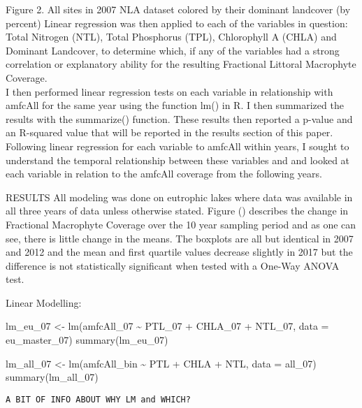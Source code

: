 \documentclass[
]{book}
\newenvironment{Shaded}{\begin{snugshade}}{\end{snugshade}}
\newcommand{\AttributeTok}[1]{\textcolor[rgb]{0.77,0.63,0.00}{#1}}
\newcommand{\FunctionTok}[1]{\textcolor[rgb]{0.00,0.00,0.00}{#1}}
\newcommand{\NormalTok}[1]{#1}
\newcommand{\OtherTok}[1]{\textcolor[rgb]{0.56,0.35,0.01}{#1}}
\newcommand{\SpecialCharTok}[1]{\textcolor[rgb]{0.00,0.00,0.00}{#1}}
\begin{document}
Figure 2. All sites in 2007 NLA dataset colored by their dominant landcover (by percent)
Linear regression was then applied to each of the variables in question: Total Nitrogen (NTL), Total Phosphorus (TPL), Chlorophyll A (CHLA) and Dominant Landcover, to determine which, if any of the variables had a strong correlation or explanatory ability for the resulting Fractional Littoral Macrophyte Coverage.\\
I then performed linear regression tests on each variable in relationship with amfcAll for the same year using the function lm() in R. I then summarized the results with the summarize() function. These results then reported a p-value and an R-squared value that will be reported in the results section of this paper. Following linear regression for each variable to amfcAll within years, I sought to understand the temporal relationship between these variables and and looked at each variable in relation to the amfcAll coverage from the following years.

RESULTS
All modeling was done on eutrophic lakes where data was available in all three years of data unless otherwise stated.
Figure () describes the change in Fractional Macrophyte Coverage over the 10 year sampling period and as one can see, there is little change in the means. The boxplots are all but identical in 2007 and 2012 and the mean and first quartile values decrease slightly in 2017 but the difference is not statistically significant when tested with a One-Way ANOVA test.

Linear Modelling:

\begin{Shaded}
\begin{Highlighting}[]
\NormalTok{lm\_eu\_07 }\OtherTok{\textless{}{-}} \FunctionTok{lm}\NormalTok{(amfcAll\_07 }\SpecialCharTok{\textasciitilde{}}\NormalTok{ PTL\_07 }\SpecialCharTok{+}\NormalTok{ CHLA\_07 }\SpecialCharTok{+}\NormalTok{ NTL\_07, }\AttributeTok{data =}\NormalTok{ eu\_master\_07)}
\FunctionTok{summary}\NormalTok{(lm\_eu\_07)}


\NormalTok{lm\_all\_07 }\OtherTok{\textless{}{-}} \FunctionTok{lm}\NormalTok{(amfcAll\_bin }\SpecialCharTok{\textasciitilde{}}\NormalTok{ PTL }\SpecialCharTok{+}\NormalTok{ CHLA }\SpecialCharTok{+}\NormalTok{ NTL, }\AttributeTok{data =}\NormalTok{ all\_07)}
\FunctionTok{summary}\NormalTok{(lm\_all\_07)}
\end{Highlighting}
\end{Shaded}

\begin{verbatim}
A BIT OF INFO ABOUT WHY LM and WHICH?
\end{verbatim}
\end{document}
